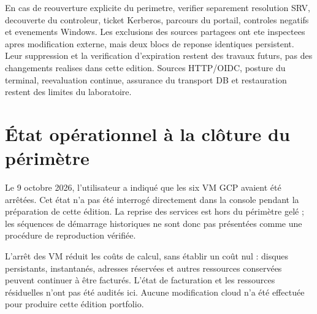 \documentclass[a4paper,12pt]{report}
\begin{document}
En cas de reouverture explicite du perimetre, verifier separement resolution SRV, decouverte du controleur, ticket Kerberos, parcours du portail, controles negatifs et evenements Windows. Les exclusions des sources partagees ont ete inspectees apres modification externe, mais deux blocs de reponse identiques persistent. Leur suppression et la verification d'expiration restent des travaux futurs, pas des changements realises dans cette edition. Sources HTTP/OIDC, posture du terminal, reevaluation continue, assurance du transport DB et restauration restent des limites du laboratoire.

\section{État opérationnel à la clôture du périmètre}
Le 9 octobre 2026, l'utilisateur a indiqué que les six VM GCP avaient été arrêtées. Cet état n'a pas été interrogé directement dans la console pendant la préparation de cette édition. La reprise des services est hors du périmètre gelé ; les séquences de démarrage historiques ne sont donc pas présentées comme une procédure de reproduction vérifiée.

L'arrêt des VM réduit les coûts de calcul, sans établir un coût nul : disques persistants, instantanés, adresses réservées et autres ressources conservées peuvent continuer à être facturés. L'état de facturation et les ressources résiduelles n'ont pas été audités ici. Aucune modification cloud n'a été effectuée pour produire cette édition portfolio.
\end{document}
